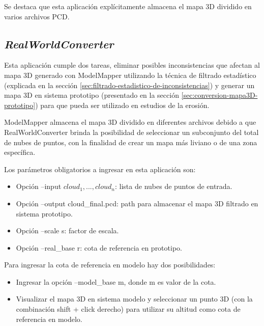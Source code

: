 Se destaca que esta aplicación explícitamente almacena el mapa 3D dividido en varios archivos PCD. 

\subsection{\textit{RealWorldConverter}}
 
Esta aplicación cumple dos tareas, eliminar posibles inconsistencias que afectan al mapa 3D generado con ModelMapper utilizando la técnica de filtrado estadístico (explicada en la sección \ref{sec:filtrado-estadistico-de-inconsistencias}) y generar un mapa 3D en sistema prototipo (presentado en la sección \ref{sec:conversion-mapa3D-prototipo}) para que pueda ser utilizado en estudios de la erosión.

ModelMapper almacena el mapa 3D dividido en diferentes archivos debido a que RealWorldConverter brinda la posibilidad de seleccionar un subconjunto del total de nubes de puntos, con la finalidad de crear un mapa más liviano o de una zona específica. 

Los parámetros obligatorios a ingresar en esta aplicación son:

\begin{itemize}
\item Opción --input $ cloud_{1}, ..., cloud_{n} $: lista de nubes de puntos de entrada.

\item Opción --output cloud\_final.pcd: path para almacenar el mapa 3D filtrado en sistema prototipo.

\item Opción --scale s: factor de escala.

\item Opción --real\_base r: cota de referencia en prototipo.

\end{itemize}

Para ingresar la cota de referencia en modelo hay dos posibilidades: 
\begin{itemize}

\item Ingresar la opción --model\_base m, donde m es valor de la cota.

\item Visualizar el mapa 3D en sistema modelo y seleccionar un punto 3D (con la combinación shift + click derecho) para utilizar su altitud como cota de referencia en modelo.

\end{itemize}




